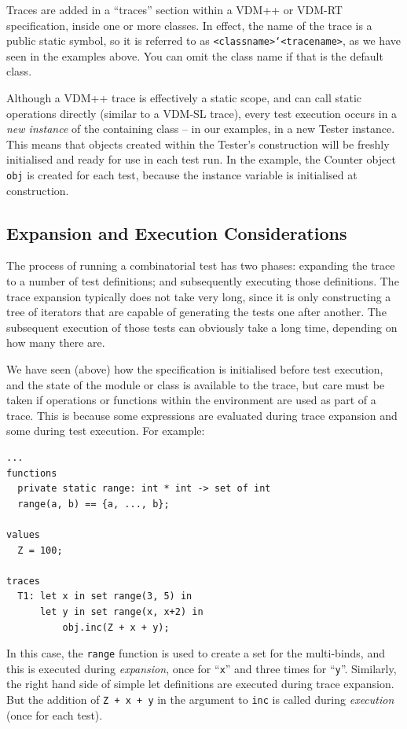 \documentclass{overturerepchap}
\begin{document}
Traces are added in a ``traces'' section within a VDM++ or VDM-RT
specification, inside one or more classes. In effect, the name of the trace is
a public static symbol, so it is referred to as
\texttt{<classname>`<tracename>}, as we have seen in the examples above. You
can omit the class name if that is the default class.

Although a VDM++ trace is effectively a static scope, and can call static
operations directly (similar to a VDM-SL trace), every test execution occurs in
a \emph{new instance} of the containing class -- in our examples, in a new Tester
instance. This means that objects created within the Tester's construction will
be freshly initialised and ready for use in each test run. In the example, the
Counter object \texttt{obj} is created for each test, because the instance
variable is initialised at construction.

\subsection{Expansion and Execution Considerations}

The process of running a combinatorial test has two phases: expanding the trace
to a number of test definitions; and subsequently executing those definitions.
The trace expansion typically does not take very long, since it is only
constructing a tree of iterators that are capable of generating the tests one
after another. The subsequent execution of those tests can obviously take a long
time, depending on how many there are.

We have seen (above) how the specification is initialised before test execution,
and the state of the module or class is available to the trace, but care must be
taken if operations or functions within the environment are used as part of a
trace. This is because some expressions are evaluated during trace expansion and
some during test execution. For example:

\small
\begin{lstlisting}
...
functions
  private static range: int * int -> set of int
  range(a, b) == {a, ..., b};

values
  Z = 100;

traces
  T1: let x in set range(3, 5) in
      let y in set range(x, x+2) in
          obj.inc(Z + x + y);
\end{lstlisting}
\normalsize

In this case, the \texttt{range} function is used to create a set for the
multi-binds, and this is executed during \emph{expansion}, once for ``\texttt{x}'' and three
times for ``\texttt{y}''. Similarly, the right hand side of simple let definitions are
executed during trace expansion. But the addition of \texttt{Z + x + y} in the
argument to \texttt{inc} is called during \emph{execution} (once for each test).
\end{document}
